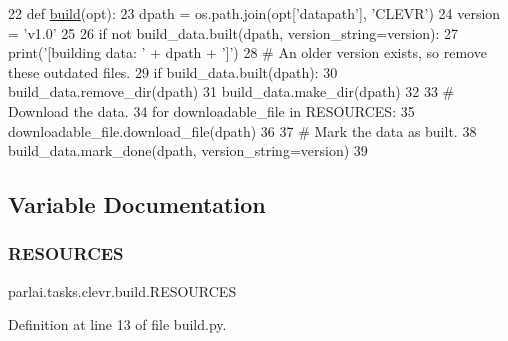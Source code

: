 \begin{DoxyCode}
22 \textcolor{keyword}{def }\hyperlink{namespacedialog__babi__feedback_1_1build_a7a9d289f7493a5ded13c4b7f071b6184}{build}(opt):
23     dpath = os.path.join(opt[\textcolor{stringliteral}{'datapath'}], \textcolor{stringliteral}{'CLEVR'})
24     version = \textcolor{stringliteral}{'v1.0'}
25 
26     \textcolor{keywordflow}{if} \textcolor{keywordflow}{not} build\_data.built(dpath, version\_string=version):
27         print(\textcolor{stringliteral}{'[building data: '} + dpath + \textcolor{stringliteral}{']'})
28         \textcolor{comment}{# An older version exists, so remove these outdated files.}
29         \textcolor{keywordflow}{if} build\_data.built(dpath):
30             build\_data.remove\_dir(dpath)
31         build\_data.make\_dir(dpath)
32 
33         \textcolor{comment}{# Download the data.}
34         \textcolor{keywordflow}{for} downloadable\_file \textcolor{keywordflow}{in} RESOURCES:
35             downloadable\_file.download\_file(dpath)
36 
37         \textcolor{comment}{# Mark the data as built.}
38         build\_data.mark\_done(dpath, version\_string=version)
39 \end{DoxyCode}


\subsection{Variable Documentation}
\mbox{\label{namespaceparlai_1_1tasks_1_1clevr_1_1build_adec962bd367c9ef6eef98ab215970488}} 
\subsubsection{\texorpdfstring{R\+E\+S\+O\+U\+R\+C\+ES}{RESOURCES}}
{\footnotesize\ttfamily parlai.\+tasks.\+clevr.\+build.\+R\+E\+S\+O\+U\+R\+C\+ES}



Definition at line 13 of file build.\+py.

